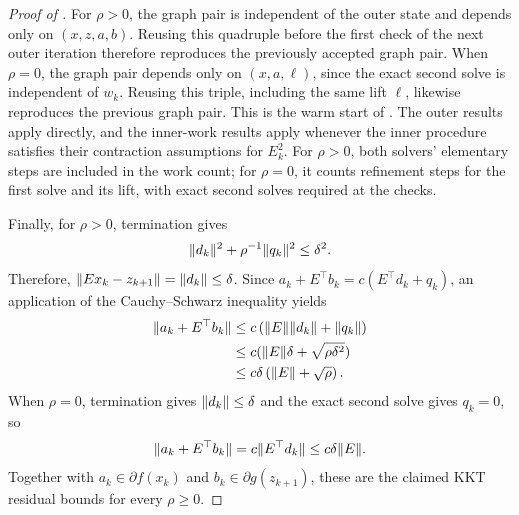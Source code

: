 \documentclass[11pt]{article}
\begin{document}
\begin{proof}[Proof of ]
    For $\rho>0$, the graph pair is independent of the outer state and depends only on $(x,z,a,b)$.
    Reusing this quadruple before the first check of the next outer iteration therefore reproduces the previously accepted graph pair.
    When $\rho=0$, the graph pair depends only on $(x,a,\ell)$, since the exact second solve  is independent of $w_k$.
    Reusing this triple, including the same lift $\ell$, likewise reproduces the previous graph pair.
    This is the warm start of .
    The outer results apply directly, and the inner-work results apply whenever the inner procedure satisfies their contraction assumptions for $E_k^2$.
    For $\rho>0$, both solvers' elementary steps are included in the work count; for $\rho=0$, it counts refinement steps for the first solve and its lift, with exact second solves required at the checks.

    Finally, for $\rho>0$, termination gives
    \begin{align}
        \lVert d_k\rVert^2+\rho^{-1}\lVert q_k\rVert^2\leq\delta^2.
    \end{align}
    Therefore, $\lVert Ex_k-z_{k+1}\rVert=\lVert d_k\rVert\leq\delta$.
    Since $a_k+ E^\top b_k=c( E^\top d_k+q_k)$, an application of the Cauchy--Schwarz inequality yields
    \begin{align}
        \lVert a_k+ E^\top b_k\rVert
        &\leq c\left(\lVert E\rVert\lVert d_k\rVert+\lVert q_k\rVert\right)\\
        &\leq c(\lVert E\rVert\delta + \sqrt{\rho\delta^2})\\
        &\leq c\delta\left( \lVert E\rVert + \sqrt{\rho} \right).
    \end{align}
    When $\rho=0$, termination gives $\lVert d_k\rVert\leq\delta$ and the exact second solve gives $q_k=0$, so
    \begin{align}
        \lVert a_k+E^\top b_k\rVert=c\lVert E^\top d_k\rVert\leq c\delta\lVert E\rVert.
    \end{align}
    Together with $a_k\in\partial f(x_k)$ and $b_k\in\partial g(z_{k+1})$, these are the claimed KKT residual bounds for every $\rho\geq0$.
\end{proof}
\end{document}
